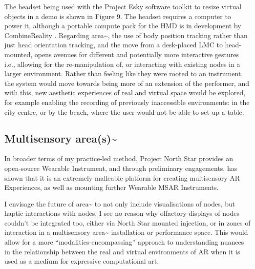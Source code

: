 The headset being used with the Project Esky software toolkit \citep{rompapas2020} to resize virtual objects in a demo is shown in Figure 9. The headset requires a computer to power it, although a portable compute pack for the HMD is in development by CombineReality \citeyearpar{combinereality2020}. Regarding area\textasciitilde{}, the use of body position tracking rather than just head orientation tracking, and the move from a desk-placed LMC to head-mounted, opens avenues for different and potentially more interactive gestures i.e., allowing for the re-manipulation of, or interacting with existing nodes in a larger environment. Rather than feeling like they were rooted to an instrument, the system would move towards being more of an extension of the performer, and with this, new aesthetic experiences of real and virtual space would be explored, for example enabling the recording of previously inaccessible environments: in the city centre, or by the beach, where the user would not be able to set up a table. 

\subsection{Multisensory area(s)\textasciitilde{}}  \label{sec: area-future-multisensory}
In broader terms of my practice-led method, Project North Star provides an open-source Wearable Instrument, and through preliminary engagements, has shown that it is an extremely malleable platform for creating multisensory AR Experiences, as well as mounting further Wearable MSAR Instruments.

 I envisage the future of area\textasciitilde{} to not only include visualisations of nodes, but haptic interactions with nodes. I see no reason why olfactory displays of nodes couldn’t be integrated too, either via North Star mounted injection, or in zones of interaction in a multisensory area\textasciitilde{} installation or performance space. This would allow for a more “modalities-encompassing” \citep{schraffenberger2016} approach to understanding nuances in the relationship between the real and virtual environments of AR when it is used as a medium for expressive computational art.